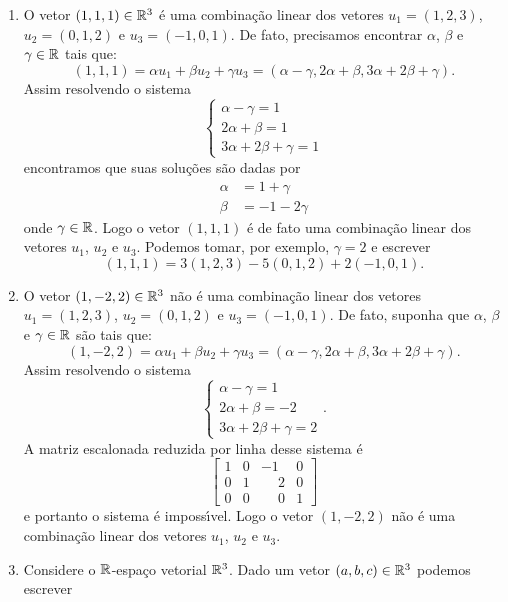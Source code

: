 \begin{exemplo}
	\begin{enumerate}[label={\arabic*})]
		\item O vetor $(1, 1, 1) \in \mathbb{R}^3$ \'e uma combina\c{c}\~ao linear dos vetores $u_1 = (1, 2, 3)$, $u_2 = (0, 1, 2)$ e $u_3 = (-1, 0, 1)$. De fato, precisamos encontrar $\alpha$, $\beta$ e $\gamma \in \mathbb{R}$ tais que:
		\[
				(1, 1, 1) = \alpha u_1 + \beta u_2 + \gamma u_3 = (\alpha - \gamma, 2\alpha + \beta, 3\alpha + 2\beta + \gamma).
		\]
		Assim resolvendo o sistema
		\[
		\begin{cases}
			\alpha - \gamma = 1\\
			2\alpha + \beta = 1\\
			3\alpha + 2\beta + \gamma = 1
		\end{cases}
		\]
		encontramos que suas solu\c{c}\~oes s\~ao dadas por
		\begin{align*}
			\alpha &= 1 + \gamma\\
			\beta &= -1 - 2\gamma
		\end{align*}
		onde $\gamma \in \mathbb{R}$. Logo o vetor $(1, 1, 1)$ \'e de fato uma combina\c{c}\~ao linear dos vetores $u_1$, $u_2$ e $u_3$. Podemos tomar, por exemplo, $\gamma = 2$ e escrever
		\[
			(1, 1, 1) = 3(1, 2, 3) - 5(0, 1, 2) + 2(-1, 0 , 1).
		\]
		\item O vetor $(1, -2, 2) \in \mathbb{R}^3$ n\~ao \'e uma combina\c{c}\~ao linear dos vetores $u_1 = (1, 2, 3)$, $u_2 = (0, 1, 2)$ e $u_3 = (-1, 0, 1)$. De fato, suponha que $\alpha$, $\beta$ e $\gamma \in \mathbb{R}$ s\~ao tais que:
		\[
			(1, -2, 2) = \alpha u_1 + \beta u_2 + \gamma u_3 = (\alpha - \gamma, 2\alpha + \beta, 3\alpha + 2\beta + \gamma).
		\]
		Assim resolvendo o sistema
		\[
		\begin{cases}
			\alpha - \gamma = 1\\
			2\alpha + \beta = -2\\
			3\alpha + 2\beta + \gamma = 2
		\end{cases}.
		\]
		A matriz escalonada reduzida por linha desse sistema \'e
		\[
			\begin{bmatrix}
				1 & 0 & -1 & 0\\
				0 & 1 & \phantom{-}2 & 0\\
				0 & 0 & \phantom{-}0 & 1
			\end{bmatrix}
		\]
		e portanto o sistema \'e imposs{\'\i}vel. Logo o vetor $(1, -2, 2)$ n\~ao \'e uma combina\c{c}\~ao linear dos vetores $u_1$, $u_2$ e $u_3$.
	\item Considere o $\mathbb{R}$-espa\c{c}o vetorial $\mathbb{R}^3$. Dado um vetor $(a, b, c) \in \mathbb{R}^3$ podemos escrever

\end{enumerate}
\end{exemplo}

